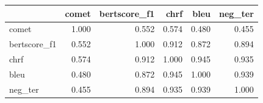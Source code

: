 \begin{tabular}{lrrrrr}
\toprule
 & comet & bertscore\_f1 & chrf & bleu & neg\_ter \\
\midrule
comet & 1.000 & 0.552 & 0.574 & 0.480 & 0.455 \\
bertscore\_f1 & 0.552 & 1.000 & 0.912 & 0.872 & 0.894 \\
chrf & 0.574 & 0.912 & 1.000 & 0.945 & 0.935 \\
bleu & 0.480 & 0.872 & 0.945 & 1.000 & 0.939 \\
neg\_ter & 0.455 & 0.894 & 0.935 & 0.939 & 1.000 \\
\bottomrule
\end{tabular}
